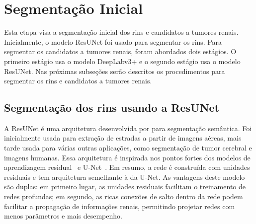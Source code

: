 \section{Segmentação Inicial}
\label{sec:metodo-segmentacao-inicial}


Esta etapa visa a segmentação inicial dos rins e candidatos a tumores renais. Inicialmente, o modelo ResUNet foi usado para segmentar os rins. Para segmentar os candidatos a tumores renais, foram abordados dois estágios. O primeiro estágio usa o modelo DeepLabv3+ e o segundo estágio usa o modelo ResUNet. Nas próximas subseções serão descritos os procedimentos para segmentar os rins e candidatos a tumores renais.

\subsection{Segmentação dos rins usando a ResUNet}
\label{sec:metodo-segmentacao-dos-rins-ResUNet}

A ResUNet é uma arquitetura desenvolvida por  para segmentação semântica. Foi inicialmente usada para extração de estradas a partir de imagens aéreas, mais tarde usada para várias outras aplicações, como segmentação de tumor cerebral e imagens humanas. Essa arquitetura é inspirada nos pontos fortes dos modelos de aprendizagem residual~\cite{He7780459} e U-Net~\cite{ronneberger2015u}. Em resumo, a rede é construída com unidades residuais e tem arquitetura semelhante à da U-Net. As vantagens deste modelo são duplas: em primeiro lugar, as unidades residuais facilitam o treinamento de redes profundas; em segundo, as ricas conexões de salto dentro da rede podem facilitar a propagação de informações renais, permitindo projetar redes com menos parâmetros e mais desempenho.


